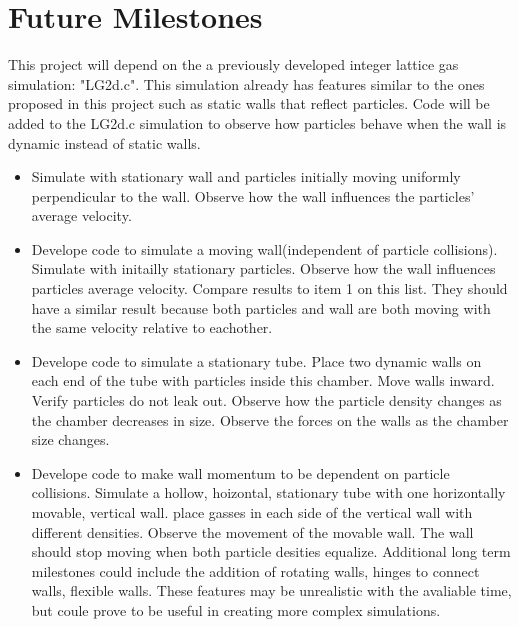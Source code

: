 \documentclass{article}
\begin{document}
\section{Future Milestones}
This project will depend on the a previously developed integer lattice gas simulation: "LG2d.c". This simulation already has features similar to the ones proposed in this project such as static walls that reflect particles. Code will be added to the LG2d.c simulation to observe how particles behave when the wall is dynamic instead of static walls. 
\begin{itemize}
  \item Simulate with stationary wall and particles initially moving uniformly perpendicular to the wall. Observe how the wall influences the particles' average velocity.  
  \item Develope code to simulate a moving wall(independent of particle collisions). Simulate with initailly stationary particles. Observe how the wall influences particles average velocity. Compare results to item 1 on this list. They should have a similar result because both particles and wall are both moving with the same velocity relative to eachother.
  \item Develope code to simulate a stationary tube. Place two dynamic walls on each end of the tube with particles inside this chamber. Move walls inward. Verify particles do not leak out. Observe how the particle density changes as the chamber decreases in size. Observe the forces on the walls as the chamber size changes.
  \item Develope code to make wall momentum to be dependent on particle collisions. Simulate a hollow, hoizontal, stationary tube with one horizontally movable, vertical wall. place gasses in each side of the vertical wall with different densities. Observe the movement of the movable wall. The wall should stop moving when both particle desities equalize.\newline
\vspace{5mm}\newline
Additional long term milestones could include the addition of rotating walls, hinges to connect walls, flexible walls. These features may be unrealistic with the avaliable time, but coule prove to be useful in creating more complex simulations.
\end{itemize}
\end{document}
